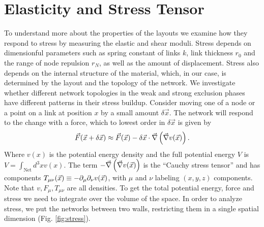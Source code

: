 \documentclass[nofootinbib,preprint,floatfix]{revtex4} %
\begin{document}
\section{Elasticity and Stress Tensor}
To understand more about the properties of the layouts we examine how they respond to stress by measuring the elastic and shear moduli. 
Stress depends on dimensionful parameters such as spring constant of links $k$, link thickness $r_0$ and the range of node repulsion $r_N$, as well as the amount of displacement. 
Stress also depends on the internal structure of the material, which, in our case, is determined by the layout and the topology of the network. 
We investigate whether different network topologies in the weak and strong exclusion phases have different patterns in their stress buildup. 
Consider moving one of a node or a point on a link at position $x$ by a small amount $\delta \vec{x}$.
The network will respond to the change with a force, which to lowest order in $\delta \vec{x}$ is given by
\[\vec{F} (\vec{x}+\delta \vec{x}) \approx %
\vec{F} (\vec{x})-\delta \vec{x}\cdot  \vec{\del} \pr{\vec{\del} v (\vec{x})}.\]
Where $v(x)$ is the potential energy density and the full potential energy $V$ is $V = \int_\mathrm{Net} d^3x v(x)$. 
The term $-\vec{\nabla} \left(\vec{\nabla} v (\vec{x})\right)$ is the ``Cauchy stress tensor'' and has components $T_{\mu\nu}(\vec{x}) \equiv -\partial_\mu\partial_\nu v(\vec{x})$, with $\mu$ and $\nu$ labeling $(x,y,z)$ components. 
Note that $v,F_\mu,T_{\mu\nu}$ are all densities. 
To get the total potential energy, force and stress we need to integrate over the volume of the space. 
In order to analyze stress, we put the networks between two walls, restricting them in a single spatial dimension (Fig. \ref{fig:stress}).
\end{document}
